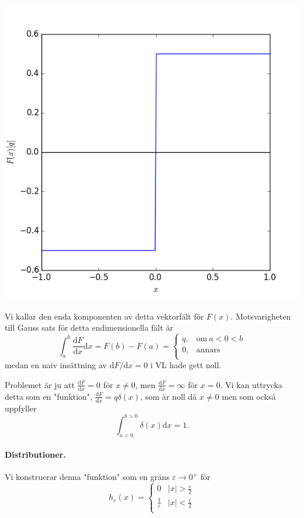 \documentclass[%
oneside,                 %
final,                   %
10pt]{article}
\begin{document}
\centerline{\includegraphics[width=0.8\linewidth]{fig/pointcharge_field_1dim.png}}



Vi kallar den enda komponenten av detta vektorfält för $F(x)$. Motsvarigheten till Gauss sats för detta endimensionella fält är 
\begin{equation}
\int_a^b \frac{\mbox{d}F}{\mbox{d}x} \mbox{d}x  = F(b) - F(a) = 
\left\{
\begin{array}{ll}
q, & \mathrm{om~} a < 0 < b \\ 
0, & \mathrm{annars} \\ 
\end{array}
\right.
\end{equation}
medan en naiv insättning av $\mbox{d}F / \mbox{d}x = 0$ i VL hade gett noll.

Problemet är ju att $\frac{\mbox{d}F}{\mbox{d}x} = 0$ för $x \neq 0$, men $\frac{\mbox{d}F}{\mbox{d}x} =  \infty$ för $x = 0$. Vi kan uttrycka detta som en "funktion", $\frac{\mbox{d}F}{\mbox{d}x} = q \delta(x)$, som är noll då $x \neq 0$ men som också uppfyller
\begin{equation}
\int_{a<0}^{b>0} \delta(x) \mbox{d}x = 1.
\end{equation}

\paragraph{Distributioner.}
Vi konstruerar denna "funktion" som en gräns $\varepsilon \to 0^+$ för
\begin{equation}
h_\varepsilon(x)
= 
\left\{
\begin{array}{ll}
0 & |x| > \frac{\varepsilon}{2} \\ 
\frac{1}{\varepsilon} & |x| < \frac{\varepsilon}{2} \\ 
\end{array}
\right.
\end{equation}
\end{document}
